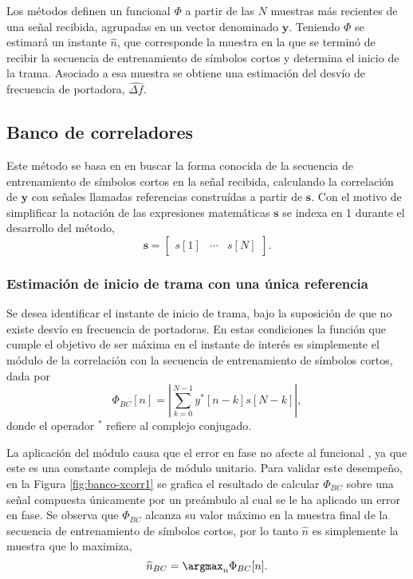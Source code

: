 Los métodos definen un \color{RoyalBlue} funcional \color{black} $\Phi$ a partir de las $N$ muestras más recientes de una señal recibida, agrupadas en un vector denominado $\mathbf{y}$. Teniendo $\Phi$ se estimará un instante $\widehat{n}$, que corresponde la muestra en la que se terminó de recibir la secuencia de entrenamiento de símbolos cortos y determina el inicio de la trama. Asociado a esa muestra se obtiene una estimación del desvío de frecuencia de portadora, $\widehat{\Delta f}$. 

\subsection{Banco de correladores}
\label{S:ch3-banco}

Este método se basa en en buscar la forma conocida de la secuencia de entrenamiento de símbolos cortos en la señal recibida, calculando la correlación de $\mathbf{y}$ con señales llamadas referencias construídas a partir de $\mathbf{s}$. \color{Red} Con el motivo de simplificar la notación de las expresiones matemáticas $\mathbf{s}$ se indexa en 1 durante el desarrollo del método,
\begin{equation}
    \mathbf{s} = \begin{bmatrix}s[1] & \cdots & s[N]\end{bmatrix}.
\end{equation}
\color{black}

\subsubsection{Estimación de inicio de trama con una única referencia}

Se desea identificar el instante de inicio de trama, bajo la suposición de que no existe desvío en frecuencia de portadoras. En estas condiciones la función que cumple el objetivo de ser máxima en el instante de interés es simplemente el módulo de la correlación con la secuencia de entrenamiento de símbolos cortos, dada por
\begin{equation}\label{eq:correladores-1}
    \Phi_{BC}[n] = \left\lvert \sum_{k=0}^{N-1}y^\ast[n-k]s[N-k] \right\rvert,
\end{equation}
\color{Red}donde el operador $^\ast$ refiere al complejo conjugado.\color{black}

La aplicación del módulo causa que el error en fase no afecte al \color{RoyalBlue} funcional \color{black}, ya que este es una constante compleja de módulo unitario. Para validar este desempeño, en la Figura \ref{fig:banco-xcorr1} se grafica el resultado de calcular $\Phi_{BC}$ sobre una señal compuesta únicamente por un preámbulo al cual se le ha aplicado un error en fase. Se observa que $\Phi_{BC}$ alcanza su valor máximo en la muestra final de la secuencia de entrenamiento de símbolos cortos, por lo tanto $\widehat{n}$ es simplemente la muestra que lo maximiza,
\begin{equation}
    \widehat{n}_{BC} = \argmax_n\Phi_{BC}[n].
\end{equation}

